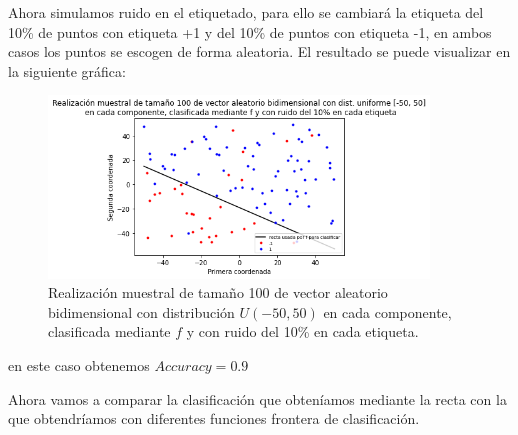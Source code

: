 \documentclass[11pt,a4paper]{article}
\theoremstyle{definition}
\begin{document}
	Ahora simulamos ruido en el etiquetado, para ello se cambiará la etiqueta del 10\% de puntos con etiqueta +1 y del 10\% de puntos con etiqueta -1, en ambos casos los puntos se escogen de forma aleatoria. El resultado se puede visualizar en la siguiente gráfica:
	\begin{figure}[H]
		\centering
		\includegraphics[width=0.9\textwidth]{images/1_2_b}
		\caption{Realización muestral de tamaño 100 de vector aleatorio bidimensional con distribución $U(-50,50)$ en cada componente, clasificada mediante $f$ y con ruido del 10\% en cada etiqueta.}
	\end{figure}
	en este caso obtenemos $Accuracy=0.9$
	
	Ahora vamos a comparar la clasificación que obteníamos mediante la recta con la que obtendríamos con diferentes funciones frontera de clasificación.
	
\end{document}
